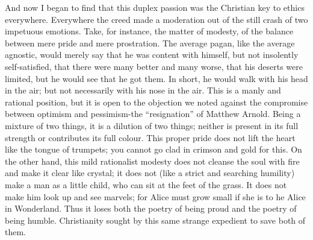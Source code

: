 \documentclass{book}
\begin{document}
And now I began to find that this duplex passion was the Christian key to ethics everywhere. Everywhere the creed made a moderation out of the still crash of two impetuous emotions. Take, for instance, the matter of modesty, of the balance between mere pride and mere prostration. The average pagan, like the average agnostic, would merely say that he was content with himself, but not insolently self-satisfied, that there were many better and many worse, that his deserts were limited, but he would see that he got them. In short, he would walk with his head in the air; but not necessarily with his nose in the air. This is a manly and rational position, but it is open to the objection we noted against the compromise between optimism and pessimism-the “resignation” of Matthew Arnold. Being a mixture of two things, it is a dilution of two things; neither is present in its full strength or contributes its full colour. This proper pride does not lift the heart like the tongue of trumpets; you cannot go clad in crimson and gold for this. On the other hand, this mild rationalist modesty does not cleanse the soul with fire and make it clear like crystal; it does not (like a strict and searching humility) make a man as a little child, who can sit at the feet of the grass. It does not make him look up and see marvels; for Alice must grow small if she is to he Alice in Wonderland. Thus it loses both the poetry of being proud and the poetry of being humble. Christianity sought by this same strange expedient to save both of them.
\end{document}
